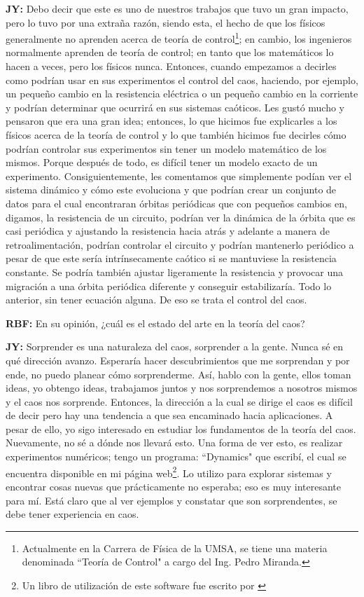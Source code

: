 \documentclass{rbf}
\newcommand{\mr}{{\bf RBF: }}
\newcommand{\jim}{{\bf JY: }}
\begin{document}
\jim Debo decir que este es uno de nuestros trabajos que tuvo un gran impacto, pero lo tuvo por una extraña razón, siendo esta, el hecho de que los físicos generalmente no aprenden acerca de teoría de control\footnote{Actualmente en la Carrera de Física de la UMSA, se tiene una materia denominada ``Teoría de Control" a cargo del Ing. Pedro Miranda.}; en cambio, los ingenieros normalmente aprenden de teoría de control; en tanto que los matemáticos lo hacen a veces, pero los físicos nunca. Entonces, cuando empezamos a decirles como podrían usar en sus experimentos el control del caos, haciendo, por ejemplo, un pequeño cambio en la resistencia eléctrica o un pequeño cambio en la corriente y podrían determinar que ocurrirá en sus sistemas caóticos. Les gustó mucho y pensaron que era una gran idea; entonces, lo que hicimos fue explicarles a los físicos acerca de la teoría de control y lo que también hicimos fue decirles cómo podrían controlar sus experimentos sin tener un modelo matemático de los mismos. Porque después de todo, es difícil tener un modelo exacto de un experimento. Consiguientemente, les comentamos
que simplemente podían ver el sistema dinámico y cómo este evoluciona y que podrían crear un conjunto de datos para el cual encontraran órbitas periódicas que con pequeños cambios en, digamos, la resistencia de un circuito, podrían ver la dinámica de la órbita que es casi periódica y ajustando la resistencia hacia atrás y adelante a manera de retroalimentación, podrían controlar el circuito y podrían mantenerlo periódico a pesar de que este sería intrínsecamente caótico si se mantuviese la resistencia constante. Se podría también ajustar ligeramente la resistencia y provocar una migración a una órbita periódica diferente y conseguir estabilizaría. Todo lo anterior, sin tener ecuación alguna. De eso se trata el control del caos.

\mr En su opinión, ¿cuál es el estado del arte en la teoría del caos?

\jim Sorprender es una naturaleza del caos, sorprender a la gente. Nunca sé en qué dirección avanzo. Esperaría hacer descubrimientos que me sorprendan y por ende, no puedo planear cómo sorprenderme. Así, hablo con la gente, ellos toman ideas, yo obtengo ideas, trabajamos juntos y nos sorprendemos a nosotros mismos
y el caos nos sorprende. Entonces, la dirección a la cual se dirige el caos es difícil de decir pero hay una tendencia a que sea encaminado hacia aplicaciones. A pesar de ello, yo sigo interesado en estudiar los fundamentos de la teoría del caos. Nuevamente, no sé a dónde nos llevará esto. Una forma de ver esto, es realizar experimentos numéricos; tengo un programa: ``Dynamics" que escribí, el cual se encuentra disponible en mi página web\footnote{Un libro de utilización de este software fue escrito por \cite{NUSSE94}}. Lo utilizo para explorar sistemas y encontrar cosas nuevas que prácticamente no esperaba; eso es muy interesante para mí. Está claro que al ver ejemplos y constatar que son sorprendentes, se debe tener experiencia en caos.
\end{document}
